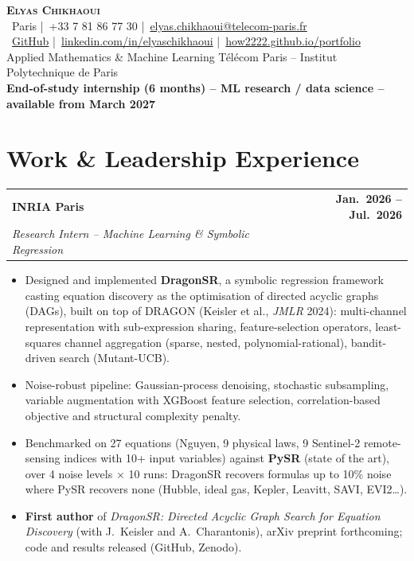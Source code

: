 \documentclass[a4paper,10pt]{article}
\makeatletter
\newcommand{\myname}{Elyas Chikhaoui}
\newcommand{\myphone}{+33 7 81 86 77 30}
\newcommand{\mymail}{elyas.chikhaoui@telecom-paris.fr}
\newcommand{\mygithub}{how2222}
\newcommand{\mylinkedin}{elyaschikhaoui}
\newcommand{\mysite}{how2222.github.io/portfolio}
\newcommand{\cventry}[4]{%
  \noindent
  \begin{tabularx}{\textwidth}{@{}X@{\hspace{6pt}}r@{}}
    \textbf{#1} & \textbf{#3}\\
    \textit{#2} & \\
  \end{tabularx}
  \par\vspace{-1pt}
  #4
  \vspace{5pt}
}
\makeatother
\begin{document}
\begin{center}
  {\LARGE\bfseries\scshape \myname}\\[4pt]
  {\small
    \faMapMarker*\ Paris
    \quad\textcolor{muted}{|}\quad \faPhone\ \myphone
    \quad\textcolor{muted}{|}\quad \faEnvelope\ \href{mailto:\mymail}{\mymail}
  }\\[3pt]
  {\small
    \faGithub\ \href{https://github.com/\mygithub}{GitHub}
    \quad\textcolor{muted}{|}\quad \faLinkedin\ \href{https://www.linkedin.com/in/\mylinkedin}{linkedin.com/in/\mylinkedin}
    \quad\textcolor{muted}{|}\quad \faGlobe\ \href{https://\mysite}{\mysite}
  }\\[4pt]
  {\small\color{muted}
    Applied Mathematics \& Machine Learning \textbar{} T\'el\'ecom Paris -- Institut Polytechnique de Paris
  }\\[2pt]
  {\small\bfseries
    End-of-study internship (6 months) -- ML research / data science -- available from March 2027
  }
\end{center}

\section{Work \& Leadership Experience}

\cventry{INRIA Paris}%
  {Research Intern -- Machine Learning \& Symbolic Regression}{Jan.~2026 -- Jul.~2026}{%
  \begin{itemize}
    \item Designed and implemented \textbf{DragonSR}, a symbolic regression framework casting equation discovery as the optimisation of directed acyclic graphs (DAGs), built on top of DRAGON (Keisler et al., \textit{JMLR} 2024): multi-channel representation with sub-expression sharing, feature-selection operators, least-squares channel aggregation (sparse, nested, polynomial-rational), bandit-driven search (Mutant-UCB).
    \item Noise-robust pipeline: Gaussian-process denoising, stochastic subsampling, variable augmentation with XGBoost feature selection, correlation-based objective and structural complexity penalty.
    \item Benchmarked on 27 equations (Nguyen, 9 physical laws, 9 Sentinel-2 remote-sensing indices with 10+ input variables) against \textbf{PySR} (state of the art), over 4 noise levels $\times$ 10 runs: DragonSR recovers formulas up to 10\% noise where PySR recovers none (Hubble, ideal gas, Kepler, Leavitt, SAVI, EVI2\ldots).
    \item \textbf{First author} of \textit{DragonSR: Directed Acyclic Graph Search for Equation Discovery} (with J.~Keisler and A.~Charantonis), arXiv preprint forthcoming; code and results released (GitHub, Zenodo).
  \end{itemize}
}
\end{document}

